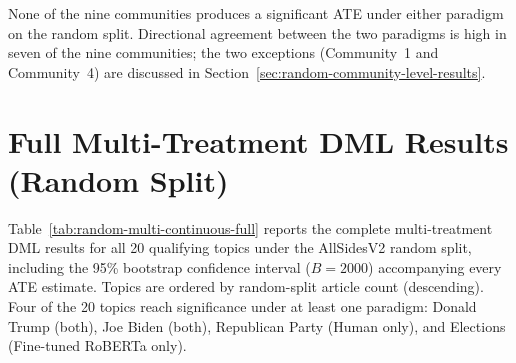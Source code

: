 None of the nine communities produces a significant ATE under either paradigm on the random split. Directional agreement between the two paradigms is high in seven of the nine communities; the two exceptions (Community~1 and Community~4) are discussed in Section~\ref{sec:random-community-level-results}.

\section{Full Multi-Treatment DML Results (Random Split)}

Table~\ref{tab:random-multi-continuous-full} reports the complete multi-treatment DML results for all 20 qualifying topics under the AllSidesV2 random split, including the 95\% bootstrap confidence interval ($B = \num{2000}$) accompanying every ATE estimate. Topics are ordered by random-split article count (descending). Four of the 20 topics reach significance under at least one paradigm: Donald Trump (both), Joe Biden (both), Republican Party (Human only), and Elections (Fine-tuned RoBERTa only).

